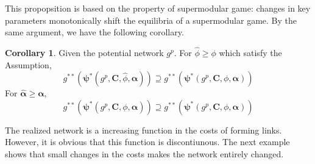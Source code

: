 \documentclass[12pt]{article}
\theoremstyle{definition}
\newtheorem{corollary}{Corollary}
\newcommand{\bm}[1]{\boldsymbol{#1}}
\begin{document}
This propopsition is based on the property of supermodular game: changes in key parameters monotonically shift the equilibria of a supermodular game.
By the same argument, we have the following corollary.

\begin{corollary}
	Given the potential network $g^p$. For $\hat{\phi} \ge \phi$ which satisfy the Assumption,
        \[ g^{**}(\bm{\psi}^*(g^p, \bm{C}, \hat{\phi}, \bm{\alpha})) \supseteq g^{**}(\bm{\psi}^*(g^p, \bm{C}, \phi, \bm{\alpha})) \]
    For $\bm{\hat{\alpha}} \ge \bm{\alpha}$,
        \[ g^{**}(\bm{\psi}^*(g^p, \bm{C}, \phi, \bm{\hat{\alpha}})) \supseteq g^{**}(\bm{\psi}^*(g^p, \bm{C}, \phi, \bm{\alpha})) \]
\end{corollary}

The realized network is a increasing function in the costs of forming links.
However, it is obvious that this function is discontiunous.
The next example shows that small changes in the costs makes the network entirely changed.
\end{document}
